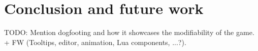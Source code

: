 \chapter*{Conclusion and future work}

TODO: Mention dogfooting and how it showcases the modifiability of the game.
+ FW (Tooltips, editor, animation, Lua components, ...?).
